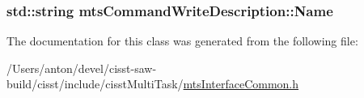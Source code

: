 \subsubsection[{Name}]{\setlength{\rightskip}{0pt plus 5cm}std\+::string mts\+Command\+Write\+Description\+::\+Name}\label{classmts_command_write_description_adfbd4ce7d572235e40f8bd0621c5a78f}


The documentation for this class was generated from the following file\+:\begin{DoxyCompactItemize}
\item 
/\+Users/anton/devel/cisst-\/saw-\/build/cisst/include/cisst\+Multi\+Task/\hyperlink{mts_interface_common_8h}{mts\+Interface\+Common.\+h}\end{DoxyCompactItemize}
